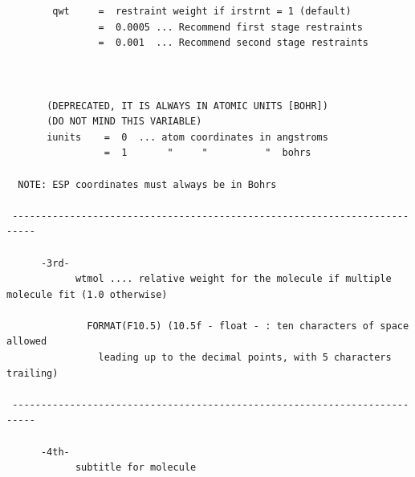\documentclass[a4paper]{article}
\begin{document}
\begin{tcolorbox}
\begin{verbatim}
        qwt     =  restraint weight if irstrnt = 1 (default)
                =  0.0005 ... Recommend first stage restraints
                =  0.001  ... Recommend second stage restraints
 
  
  
       (DEPRECATED, IT IS ALWAYS IN ATOMIC UNITS [BOHR])
       (DO NOT MIND THIS VARIABLE)
       iunits    =  0  ... atom coordinates in angstroms
                 =  1       "     "          "  bohrs

  NOTE: ESP coordinates must always be in Bohrs
 
 --------------------------------------------------------------------------
 
      -3rd- 
            wtmol .... relative weight for the molecule if multiple molecule fit (1.0 otherwise) 
 
              FORMAT(F10.5) (10.5f - float - : ten characters of space allowed
                leading up to the decimal points, with 5 characters trailing)
 
 --------------------------------------------------------------------------
 
      -4th- 
            subtitle for molecule
 
\end{verbatim}
\end{tcolorbox}
\end{document}
